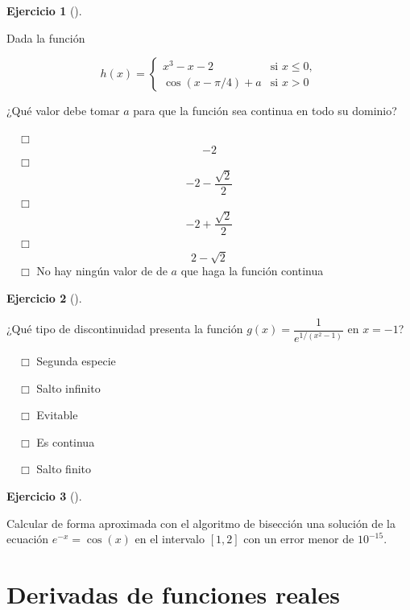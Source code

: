 \documentclass[
  a4paper,
]{scrreport}
\theoremstyle{definition}
\newtheorem{exercise}{Ejercicio}[chapter]
\theoremstyle{remark}
\begin{document}
\begin{exercise}[]\protect\hypertarget{exr-continuidad-2}{}\label{exr-continuidad-2}

Dada la función

\[
h(x)=
\begin{cases}
x^3-x-2 & \mbox{si } x\leq 0,\\
\cos(x-\pi/4)+a & \mbox{si } x>0
\end{cases}
\]

¿Qué valor debe tomar \(a\) para que la función sea continua en todo su
dominio?

${\quad\Box}$ $$-2$$
${\quad\Box}$ $$-2 - \frac{\sqrt{2}}{2}$$
${\quad\Box}$ $$-2+\frac{\sqrt{2}}{2}$$
${\quad\Box}$ $$2-\sqrt{2}$$
${\quad\Box}$ No hay ningún valor de de $a$ que haga la función continua

\end{exercise}

\begin{exercise}[]\protect\hypertarget{exr-clasificacion-discontinuidad}{}\label{exr-clasificacion-discontinuidad}

¿Qué tipo de discontinuidad presenta la función
\(g(x)=\dfrac{1}{e^{1/(x^2-1)}}\) en \(x=-1\)?

${\quad\Box}$ Segunda especie

${\quad\Box}$ Salto infinito

${\quad\Box}$ Evitable

${\quad\Box}$ Es continua

${\quad\Box}$ Salto finito

\end{exercise}

\begin{exercise}[]\protect\hypertarget{exr-raices}{}\label{exr-raices}

Calcular de forma aproximada con el algoritmo de bisección una solución
de la ecuación \(e^{-x}=\cos(x)\) en el intervalo \([1,2]\) con un error
menor de \(10^{-15}\).

\vspace{18pt}

\end{exercise}


\chapter{Derivadas de funciones
reales}\label{derivadas-de-funciones-reales}
\end{document}
